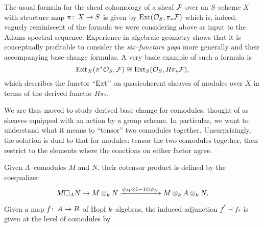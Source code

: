The usual formula for the sheaf cohomology of a sheaf $\mathcal{F}$ over an $S$--scheme $X$ with structure map $\pi\colon\thinspace X \to S$ is given by $\operatorname{Ext}(\mathcal{O}_S, \pi_* \mathcal{F})$ which is, indeed, vaguely reminiscent of the formula we were considering above as input to the Adams spectral sequence.  Experience in algebraic geometry shows that it is conceptually profitable to consider the \emph{six--functors yoga} more generally and their accompanying base-change formulas.  A very basic example of such a formula is \[\operatorname{Ext}_X(\pi^* \mathcal{O}_S, \mathcal{F}) \cong \operatorname{Ext}_S(\mathcal{O}_S, R\pi_* \mathcal{F}),\] which describes the functor ``$\operatorname{Ext}$'' on quasicoherent sheaves of modules over $X$ in terms of the derived functor $R\pi_*$.

We are thus moved to study derived base-change for comodules, thought of as sheaves equipped with an action by a group scheme.  In particular, we want to understand what it means to ``tensor'' two comodules together.  Unsurprisingly, the solution is dual to that for modules: tensor the two comodules together, then restrict to the elements where the coactions on either factor agree.

\begin{definition}
Given $A$--comodules $M$ and $N$, their cotensor product is defined by the coequalizer \[M \square_A N \to M \otimes_k N \xrightarrow{\psi_M \otimes 1 - 1 \otimes \psi_N} M \otimes_k A \otimes_k N.\]
\end{definition}

\begin{lemma}
Given a map $f \colon\thinspace A \to B$ of Hopf $k$--algebras, the induced adjunction $f^* \dashv f_*$ is given at the level of comodules by
\begin{center}
\end{center}
\end{lemma}

